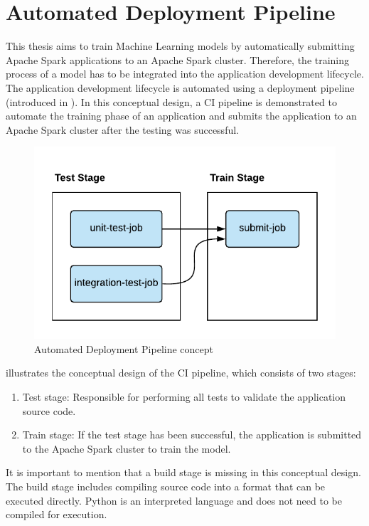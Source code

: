 \section{Automated Deployment Pipeline}
\label{sec:05_pipeline}
This thesis aims to train Machine Learning models by automatically submitting Apache Spark applications to an Apache Spark cluster. Therefore, the training process of a model has to be integrated into the application development lifecycle.
%
The application development lifecycle is automated using a deployment pipeline (introduced in ).
%
In this conceptual design, a CI pipeline is demonstrated to automate the training phase of an application and submits the application to an Apache Spark cluster after the testing was successful.


\begin{figure}[h]
\centering
\includegraphics[scale=1]{images/05_conceptual_design/automated_deployment_pipeline/ci_cd_concept}
\caption{Automated Deployment Pipeline concept}
\label{fig:05_deployment_concept}
\end{figure}
 illustrates the conceptual design of the CI pipeline, which consists of two stages:
\begin{enumerate}
\item Test stage: Responsible for performing all tests to validate the application source code.
\item Train stage: If the test stage has been successful, the application is submitted to the Apache Spark cluster to train the model.
\end{enumerate}
It is important to mention that a build stage is missing in this conceptual design. The build stage includes compiling source code into a format that can be executed directly.
Python is an interpreted language and does not need to be compiled for execution.



